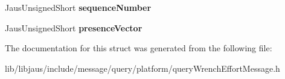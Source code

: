 \begin{DoxyCompactItemize}
\item 
\hypertarget{struct_query_wrench_effort_message_struct_a27bf322e36f1f54c8949b777ddb3c674}{\-Jaus\-Unsigned\-Short {\bfseries sequence\-Number}}\label{struct_query_wrench_effort_message_struct_a27bf322e36f1f54c8949b777ddb3c674}

\item 
\hypertarget{struct_query_wrench_effort_message_struct_ac08d944f2cddc1144cfa6024b189498b}{\-Jaus\-Unsigned\-Short {\bfseries presence\-Vector}}\label{struct_query_wrench_effort_message_struct_ac08d944f2cddc1144cfa6024b189498b}

\end{DoxyCompactItemize}


\-The documentation for this struct was generated from the following file\-:\begin{DoxyCompactItemize}
\item 
lib/libjaus/include/message/query/platform/query\-Wrench\-Effort\-Message.\-h\end{DoxyCompactItemize}
